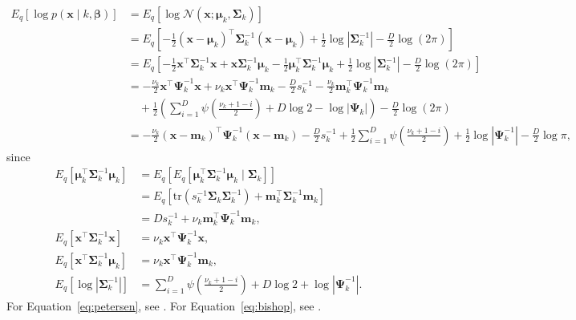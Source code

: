 \documentclass[a4paper]{article}
\begin{document}
			\begin{align}
				E_q\left[ \log p(\mathbf{x} \mid k, \bm{\beta}) \right]
				&= E_q\left[ \log \mathcal{N}(\mathbf{x}; \bm{\mu}_k, \bm{\Sigma}_k) \right] \\
				&= E_q\left[ -\frac{1}{2}(\mathbf{x} - \bm{\mu}_k)^\top \bm{\Sigma}_k^{-1} (\mathbf{x} - \bm{\mu}_k) + \frac{1}{2} \log |\bm{\Sigma}_k^{-1}| - \frac{D}{2}\log(2\pi)\right] \\
				&= E_q\left[ -\frac{1}{2}\mathbf{x}^\top \bm{\Sigma}_k^{-1} \mathbf{x} + \mathbf{x}\bm{\Sigma}_k^{-1} \bm{\mu}_k - \frac{1}{2}\bm{\mu}_k^\top \bm{\Sigma}_k^{-1} \bm{\mu}_k + \frac{1}{2} \log |\bm{\Sigma}_k^{-1}| - \frac{D}{2}\log(2\pi)\right] \\
				&= - \frac{\nu_k}{2} \mathbf{x}^\top \bm{\Psi}_k^{-1} \mathbf{x} + \nu_k \mathbf{x}^\top \bm{\Psi}_k^{-1} \mathbf{m}_k
				- \frac{D}{2} s_k^{-1} - \frac{\nu_k}{2} \mathbf{m}_k^\top \bm{\Psi}_k^{-1} \mathbf{m}_k \\
				&\quad + \frac{1}{2} \left(\sum_{i = 1}^D \psi\left( \frac{\nu_k + 1 - i}{2} \right) + D \log 2 - \log|\bm{\Psi}_k| \right)
				- \frac{D}{2} \log(2\pi) \\
				&= - \frac{\nu_k}{2} (\mathbf{x} - \mathbf{m}_k)^\top \bm{\Psi}_k^{-1} (\mathbf{x} - \mathbf{m}_k)
				- \frac{D}{2} s_k^{-1} + \frac{1}{2} \sum_{i = 1}^D \psi\left( \frac{\nu_k + 1 - i}{2} \right) + \frac{1}{2} \log|\bm{\Psi}_k^{-1}|
				- \frac{D}{2} \log\pi,
			\end{align}
			since
			\begin{align}
				E_q\left[ \bm{\mu}_k^\top \bm{\Sigma}_k^{-1} \bm{\mu}_k \right]
				&= E_q\left[ E_q\left[ \bm{\mu}_k^\top \bm{\Sigma}_k^{-1} \bm{\mu}_k \mid \bm{\Sigma}_k \right] \right] \\
				\label{eq:petersen}
				&= E_q\left[ \text{tr}\left(s_k^{-1}\bm{\Sigma}_k\bm{\Sigma}_{k}^{-1}\right) + \mathbf{m}_k^\top \bm{\Sigma}_k^{-1} \mathbf{m}_k\right] \\
				&= Ds_k^{-1} + \nu_k \mathbf{m}_k^\top \bm{\Psi}_k^{-1} \mathbf{m}_k, \\
				E_q\left[ \mathbf{x}^\top \bm{\Sigma}_k^{-1} \mathbf{x} \right]
				&= \nu_k \mathbf{x}^\top \bm{\Psi}_k^{-1} \mathbf{x}, \\
				E_q\left[\mathbf{x}^\top \bm{\Sigma}_k^{-1} \bm{\mu}_k \right]
				&= \nu_k \mathbf{x}^\top \bm{\Psi}_k^{-1} \mathbf{m}_k, \\
				\label{eq:bishop}
				E_q\left[\log |\bm{\Sigma}_k^{-1}|\right]
				&= \sum_{i = 1}^D \psi\left( \frac{\nu_k + 1 - i}{2} \right) + D\log 2 + \log|\bm{\Psi}_k^{-1}|.
			\end{align}
			For Equation~\ref{eq:petersen}, see \cite{Petersen:2008}. For Equation~\ref{eq:bishop}, see \cite{Bishop:2006}.

	
	
\end{document}
